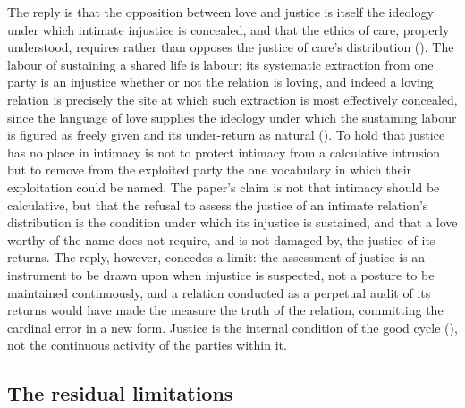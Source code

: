 The reply is that the opposition between love and justice is itself the ideology under which intimate injustice is concealed, and that the ethics of care, properly understood, requires rather than opposes the justice of care's distribution (). The labour of sustaining a shared life is labour; its systematic extraction from one party is an injustice whether or not the relation is loving, and indeed a loving relation is precisely the site at which such extraction is most effectively concealed, since the language of love supplies the ideology under which the sustaining labour is figured as freely given and its under-return as natural (). To hold that justice has no place in intimacy is not to protect intimacy from a calculative intrusion but to remove from the exploited party the one vocabulary in which their exploitation could be named. The paper's claim is not that intimacy should be calculative, but that the refusal to assess the justice of an intimate relation's distribution is the condition under which its injustice is sustained, and that a love worthy of the name does not require, and is not damaged by, the justice of its returns. The reply, however, concedes a limit: the assessment of justice is an instrument to be drawn upon when injustice is suspected, not a posture to be maintained continuously, and a relation conducted as a perpetual audit of its returns would have made the measure the truth of the relation, committing the cardinal error in a new form. Justice is the internal condition of the good cycle (), not the continuous activity of the parties within it.

\subsection{The residual limitations}
\label{p11:sec:obj-residual}

